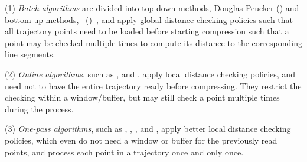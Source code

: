 \sstab (1) {\em Batch algorithms} are divided into top-down methods, \eg Douglas-Peucker (\dpa) \cite{Douglas:Peucker,Meratnia:Spatiotemporal} and bottom-up methods, \eg\ \pavlidis (\tpa)~\cite{Pavlidis:Segment}, and apply global distance checking policies such that all trajectory points need to be loaded before starting compression such that a point may be checked multiple times to compute its distance to the corresponding line segments.

\sstab (2) {\em Online algorithms}, such as \opwa \cite{Meratnia:Spatiotemporal}, \squishe \cite{Muckell:SQUISH} and \bqsa \cite{Liu:BQS}, apply local distance checking policies, and need not to have the entire trajectory ready before compressing. They restrict the checking within a window/buffer, but may still check a point  multiple times during the process.

\sstab (3) {\em One-pass algorithms}, such as \operb\cite{Lin:Operb}, \siped \cite{Williams:Longest,Sklansky:Cone,Dunham:Cone, Zhao:Sleeve}, \cised \cite{Lin:Cised}, \intersec\cite{Long:Direction} and \interval \cite{Ke:Interval}, apply better local distance checking policies, which even do not need a window or buffer for the previously read points, and process each point in a trajectory once and only once.






